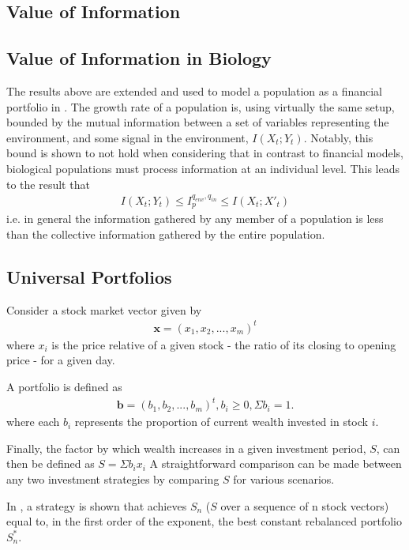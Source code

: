\documentclass[10pt, twocolumn]{IEEEtran}
\begin{document}
\subsection{Value of Information}

\subsection{Value of Information in Biology}
The results above are extended and used to model a population as a financial portfolio in \cite{Rivoire2011}.
The growth rate of a population is, using virtually the same setup, bounded by the mutual information between
a set of variables representing the environment, and some signal in the environment,  $I(X_{t};Y_{t})$.
Notably, this bound is shown to not hold when considering that in contrast to financial models, biological populations
must process information at an individual level. This leads to the result that
\begin{gather*}
  I(X_{t};Y_{t}) \le I_{p}^{q_{env},q_{in}} \le I(X_{t};X'_{t})
\end{gather*}
i.e. in general the information gathered by any member of a population is less than the collective information
gathered by the entire population.
\subsection{Universal Portfolios}
Consider a stock market vector given by
\begin{gather*}
  \boldsymbol{x} = (x_{1}, x_{2}, ..., x_{m})^{t}
\end{gather*}
where $x_{i}$ is the price relative of a given stock - the ratio of its closing to opening price - for a given day.

A portfolio is defined as
\begin{gather*}
  \boldsymbol{b} = (b_{1}, b_{2}, ..., b_{m})^{t}, b_{i} \ge 0, \Sigma b_{i} = 1.
\end{gather*}
where each $b_{i}$ represents the proportion of current wealth invested in stock $i$.

Finally, the factor by which wealth increases
in a given investment period, $S$, can then be defined as $ S = \Sigma b_{i}x_{i} $
A straightforward comparison can be made between any two investment strategies by comparing $S$ for various scenarios.

In \cite{universal}, a strategy is shown that achieves $S_{n}$ ($S$ over a sequence of n stock vectors) equal to,%
in the first order of the exponent, the best constant rebalanced portfolio $S^{*}_{n}$. 
\end{document}
